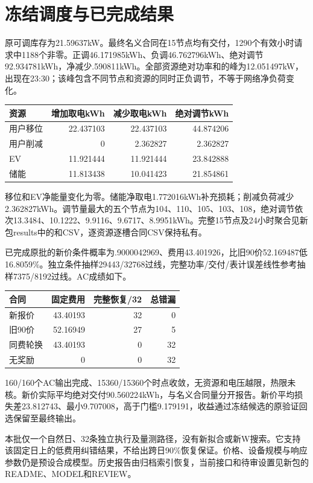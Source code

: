 \documentclass[UTF8,11pt,a4paper,fontset=fandol]{ctexart}
\begin{document}
\section{冻结调度与已完成结果}
原可调库存为21.59637kW。最终名义合同在15节点均有交付，1290个有效小时请求中1188个非零。正调46.171985kWh、负调46.762796kWh、绝对调节92.934781kWh，净减少.590811kWh。全部资源绝对功率和的峰为12.051497kW，出现在23:30；该峰包含不同节点和资源的同时正负调节，不等于网络净负荷变化。
\begin{center}
\begin{tabular}{lrrr}\toprule
资源&增加取电kWh&减少取电kWh&绝对调节kWh\\\midrule
用户移位&22.437103&22.437103&44.874206\\
用户削减&0&2.362827&2.362827\\
EV&11.921444&11.921444&23.842888\\
储能&11.813438&10.041423&21.854861\\\bottomrule
\end{tabular}
\end{center}
移位和EV净能量变化为零。储能净取电1.772016kWh补充损耗；削减负荷减少2.362827kWh。调节量最大的五个节点为104、110、105、103、108，绝对调节依次13.3484、10.1222、9.9116、9.6717、8.9951kWh。完整15节点及24小时聚合见新包results中的和CSV，逐资源逐槽合同CSV保持私有。

已完成原批的新价条件概率为.9000042969、费用43.401926，比旧90价52.169487低16.8059\%。独立条件抽样29443/32768过线，完整功率/交付/表计误差线性参考抽样7375/8192过线。AC成绩如下。
\begin{center}
\begin{tabular}{lrrr}\toprule
合同&固定费用&完整恢复/32&总错漏\\\midrule
新报价&43.40193&32&0\\
旧90价&52.16949&27&5\\
同费轮换&43.40193&0&32\\
无奖励&0&0&32\\\bottomrule
\end{tabular}
\end{center}
160/160个AC输出完成、15360/15360个时点收敛，无资源和电压越限，热限未核。新价实际平均绝对交付90.560224kWh，与名义合同量分开报告。新价平均损失差23.812743、最小9.707008，高于门槛9.179191，收益通过冻结候选的原验证回选保留至最终输出。

本批仅一个自然日、32条独立执行及量测路径，没有新拟合或新W搜索。它支持该固定日上的低费用纠错结果，不给出跨日90\%恢复保证。价格、设备规模与响应参数仍是预设合成模型。历史报告由归档索引恢复，当前接口和待审设置见新包的README、MODEL和REVIEW。
\end{document}
